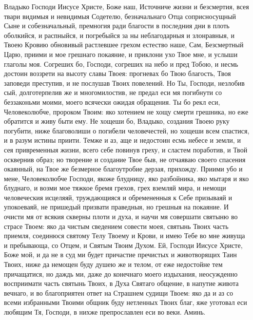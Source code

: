 Владыко Господи Иисусе Христе, Боже наш, Источниче жизни и безсмертия, всея твари видимыя и невидимыя Содетелю, безначальнаго Отца соприсносущный Сыне и собезначальный, премногия ради благости в последния дни в плоть оболкийся, и распныйся, и погребыйся за ны неблагодарныя и злонравныя, и Твоею Кровию обновивый растлевшее грехом естество наше, Сам, Безсмертный Царю, приими и мое грешнаго покаяние, и приклони ухо Твое мне, и услыши глаголы моя. Согреших бо, Господи, согреших на небо и пред Тобою, и несмь достоин воззрети на высоту славы Твоея: прогневах бо Твою благость, Твоя заповеди преступив, и не послушав Твоих повелений. Но Ты, Господи, незлобив сый, долготерпелив же и многомилостив, не предал еси мя погибнути со беззаконьми моими, моего всячески ожидая обращения. Ты бо рекл еси, Человеколюбче, пророком Твоим: яко хотением не хощу смерти грешника, но еже обратится и живу быти ему. Не хощеши бо, Владыко, создания Твоею руку погубити, ниже благоволиши о погибели человечестей, но хощеши всем спастися, и в разум истины приити. Темже и аз, аще и недостоин есмь небесе и земли, и сея привременныя жизни, всего себе повинув греху, и сластем поработив, и Твой осквернив образ; но творение и создание Твое быв, не отчаяваю своего спасения окаянный, на Твое же безмерное благоутробие дерзая, прихожду. Приими убо и мене, Человеколюбче Господи, якоже блудницу, яко разбойника, яко мытаря и яко блуднаго, и возми мое тяжкое бремя грехов, грех вземляй мира, и немощи человеческия исцеляяй, труждающияся и обремененныя к Себе призываяй и упокоеваяй, не пришедый призвати праведныя, но грешныя на покаяние. И очисти мя от всякия скверны плоти и духа, и научи мя совершати святыню во страсе Твоем: яко да чистым сведением совести моея, святынь Твоих часть приемля, соединюся святому Телу Твоему и Крови, и имею Тебе во мне живуща и пребывающа, со Отцем, и Святым Твоим Духом. Ей, Господи Иисусе Христе, Боже мой, и да не в суд ми будет причастие пречистых и животворящих Таин Твоих, ниже да немощен буду душею же и телом, от еже недостойне тем причащатися, но даждь ми, даже до конечнаго моего издыхания, неосужденно восприимати часть святынь Твоих, в Духа Святаго общение, в напутие живота вечнаго, и во благоприятен ответ на Страшнем судищи Твоем: яко да и аз со всеми избранными Твоими общник буду нетленных Твоих благ, яже уготовал еси любящим Тя, Господи, в нихже препрославлен еси во веки. Аминь.




